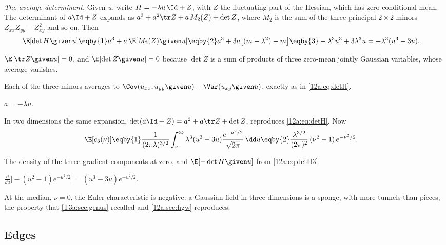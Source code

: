 \emph{The average determinant.} Given $u$, write $H=-\lambda u\,\Id+Z$, with $Z$ the fluctuating part of the
Hessian, which has zero conditional mean. The determinant of $a\Id+Z$ expands as
$a^3+a^2\tr Z+a\,M_2(Z)+\det Z$, where $M_2$ is the sum of the three principal $2\times2$ minors
$Z_{xx}Z_{yy}-Z_{xy}^2$ and so on. Then
\begin{align}
  \E[\det H\given u]
  &\eqby{1}a^3+a\,\E[M_2(Z)\given u]
   \eqby{2}a^3+3a\big[(m-\lambda^2)-m\big]
   \eqby{3}-\lambda^3u^3+3\lambda^3u
   =-\lambda^3(u^3-3u).
  \label{12a:eq:detH3}
\end{align}
\begin{explain}
  \item $\E[\tr Z\given u]=0$, and $\E[\det Z\given u]=0$ because $\det Z$ is a sum of products of three
        zero-mean jointly Gaussian variables, whose average vanishes.
  \item Each of the three minors averages to $\Cov(u_{xx},u_{yy}\given u)-\Var(u_{xy}\given u)$, exactly as in
        \eqref{12a:eq:detH}.
  \item $a=-\lambda u$.
\end{explain}
In two dimensions the same expansion, $\det(a\Id+Z)=a^2+a\tr Z+\det Z$, reproduces \eqref{12a:eq:detH}. Now
\begin{align}
  \E[c_3(\nu)]
  &\eqby{1}\frac{1}{(2\pi\lambda)^{3/2}}\int_\nu^\infty\lambda^3(u^3-3u)\frac{e^{-u^2/2}}{\sqrt{2\pi}}\,\dd u
   \eqby{2}\frac{\lambda^{3/2}}{(2\pi)^2}\,(\nu^2-1)\,e^{-\nu^2/2}.
  \label{12a:eq:gkf3}
\end{align}
\begin{explain}
  \item The density of the three gradient components at zero, and $\E[-\det H\given u]$ from
        \eqref{12a:eq:detH3}.
  \item $\frac{\dd}{\dd u}\big[-(u^2-1)e^{-u^2/2}\big]=(u^3-3u)e^{-u^2/2}$.
\end{explain}
At the median, $\nu=0$, the Euler characteristic is negative: a Gaussian field in three dimensions is a
sponge, with more tunnels than pieces, the property that \cref{T3a:sec:genus} recalled and
\cref{12a:sec:hgw} reproduces.

\subsection{Edges}
\label{12a:sec:edges}

